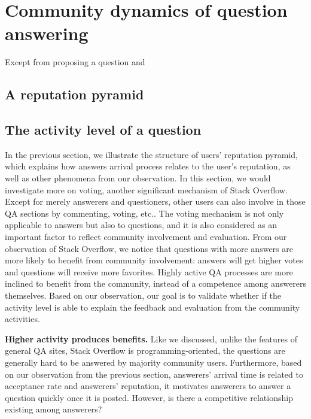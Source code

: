 \section{Community dynamics of question answering}
Except from proposing a question and 



\subsection{A reputation pyramid}

\subsection{The activity level of a question}
In the previous section, we illustrate the structure of users' reputation pyramid, which explains how answers arrival process relates to the user's reputation, as well as other phenomena from our observation. In this section, we would investigate more on voting, another significant mechanism of Stack Overflow. Except for merely answerers and questioners, other users can also involve in those QA sections by commenting, voting, etc.. The voting mechanism is not only applicable to answers but also to questions, and it is also considered as an important factor to reflect community involvement and evaluation. From our observation of Stack Overflow, we notice that questions with more answers are more likely to benefit from community involvement: answers will get higher votes and questions will receive more favorites. Highly active QA processes are more inclined to benefit from the community, instead of a competence among answerers themselves.  Based on our observation, our goal is to validate whether if the activity level is able to explain the feedback and evaluation from the community activities.

\textbf{Higher activity produces benefits.}
Like we discussed, unlike the features of general QA sites, Stack Overflow is programming-oriented, the questions are generally hard to be answered by majority community users. Furthermore, based on our observation from the previous section, answerers' arrival time is related to acceptance rate and answerers' reputation, it motivates answerers to answer a question quickly once it is posted. However, is there a competitive relationship existing among answerers?

